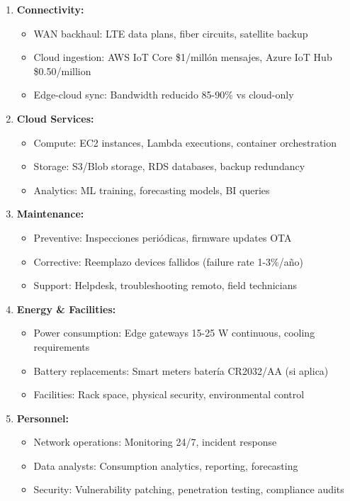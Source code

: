 \begin{enumerate}
\item \textbf{Connectivity:}
   \begin{itemize}
   \item WAN backhaul: LTE data plans, fiber circuits, satellite backup
   \item Cloud ingestion: AWS IoT Core \$1/millón mensajes, Azure IoT Hub \$0.50/million
   \item Edge-cloud sync: Bandwidth reducido 85-90\% vs cloud-only
   \end{itemize}

\item \textbf{Cloud Services:}
   \begin{itemize}
   \item Compute: EC2 instances, Lambda executions, container orchestration
   \item Storage: S3/Blob storage, RDS databases, backup redundancy
   \item Analytics: ML training, forecasting models, BI queries
   \end{itemize}

\item \textbf{Maintenance:}
   \begin{itemize}
   \item Preventive: Inspecciones periódicas, firmware updates OTA
   \item Corrective: Reemplazo devices fallidos (failure rate 1-3\%/año)
   \item Support: Helpdesk, troubleshooting remoto, field technicians
   \end{itemize}

\item \textbf{Energy \& Facilities:}
   \begin{itemize}
   \item Power consumption: Edge gateways 15-25 W continuous, cooling requirements
   \item Battery replacements: Smart meters batería CR2032/AA (si aplica)
   \item Facilities: Rack space, physical security, environmental control
   \end{itemize}

\item \textbf{Personnel:}
   \begin{itemize}
   \item Network operations: Monitoring 24/7, incident response
   \item Data analysts: Consumption analytics, reporting, forecasting
   \item Security: Vulnerability patching, penetration testing, compliance audits
   \end{itemize}
\end{enumerate}

